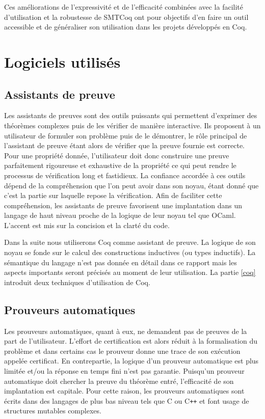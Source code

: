 \documentclass[11pt]{article}
\begin{document}
Ces améliorations de l'expressivité et de l'efficacité combinées avec la facilité d'utilisation et la robustesse de SMTCoq ont pour objectifs d'en faire un outil accessible et de généraliser son utilisation dans les projets développés en Coq.



\newpage
\section{Logiciels utilisés}

\subsection{Assistants de preuve}\label{assistants}

Les assistants de preuves sont des outils puissants qui permettent d'exprimer des théorèmes complexes puis de les vérifier de manière interactive. Ils proposent à un utilisateur de formuler son problème puis de le démontrer, le rôle principal de l'assistant de preuve étant alors de vérifier que la preuve fournie est correcte. Pour une propriété donnée, l'utilisateur doit donc construire une preuve parfaitement rigoureuse et exhaustive de la propriété ce qui peut rendre le processus de vérification long et fastidieux. La confiance accordée à ces outils dépend de la compréhension que l'on peut avoir dans son noyau, étant donné que c'est la partie sur laquelle repose la vérification. Afin de faciliter cette compréhension, les assistants de preuve favorisent une implantation dans un langage de haut niveau proche de la logique de leur noyau tel que OCaml. L'accent est mis sur la concision et la clarté du code. \medbreak

Dans la suite nous utiliserons Coq comme assistant de preuve. La logique de son noyau se fonde sur le calcul des constructions inductives \cite{coq_intro} (ou types inductifs). La sémantique du langage n'est pas donnée en détail dans ce rapport mais les aspects importants seront précisés au moment de leur utilisation. La partie \ref{coq} introduit deux techniques d'utilisation de Coq. 

\subsection{Prouveurs automatiques}\label{prouveurs}

Les prouveurs automatiques, quant à eux, ne demandent pas de preuves de la part de l'utilisateur. L'effort de certification est alors réduit à la formalisation du problème et dans certains cas le prouveur donne une trace de son exécution appelée certificat. En contrepartie, la logique d'un prouveur automatique est plus limitée et/ou la réponse en temps fini n'est pas garantie. Puisqu'un prouveur automatique doit chercher la preuve du théorème entré, l'efficacité de son implantation est capitale. Pour cette raison, les prouveurs automatiques sont écrits dans des langages de plus bas niveau tels que C ou C\texttt{++} et font usage de structures mutables complexes. \medbreak
\end{document}
